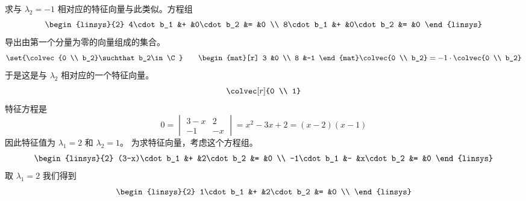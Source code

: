 \begin{exercises}
\begin{answer}
\begin{exparts}
           求与 $\lambda_2=-1$ 相对应的特征向量与此类似。方程组
           \begin{equation*}
             \begin{linsys}{2}
               4\cdot b_1  &+  &0\cdot b_2  &=  &0  \\
               8\cdot b_1  &+  &0\cdot b_2 &=  &0
             \end{linsys}
           \end{equation*}
           导出由第一个分量为零的向量组成的集合。
           \begin{equation*}
             \set{\colvec{0 \\ b_2}\suchthat b_2\in\C}
             \qquad
             \begin{mat}[r]
               3  &0  \\
               8  &-1
             \end{mat}
             \colvec{0  \\ b_2}
             =-1\cdot\colvec{0 \\ b_2}
           \end{equation*}
           于是这是与 $\lambda_2$ 相对应的一个特征向量。
           \begin{equation*}
             \colvec[r]{0 \\ 1}
           \end{equation*}
         \partsitem 特征方程是
           \begin{equation*}
             0=
             \begin{vmatrix}
               3-x  &2  \\
               -1   &-x               
             \end{vmatrix}
             =x^2-3x+2=(x-2)(x-1)
           \end{equation*}
           因此特征值为 $\lambda_1=2$ 和 $\lambda_2=1$。
           为求特征向量，考虑这个方程组。
           \begin{equation*}
             \begin{linsys}{2}
               (3-x)\cdot b_1  &+  &2\cdot b_2  &=  &0  \\
               -1\cdot b_1     &-  &x\cdot b_2  &=  &0
             \end{linsys}
           \end{equation*}
           取 $\lambda_1=2$ 我们得到
           \begin{equation*}
             \begin{linsys}{2}
                1\cdot b_1  &+  &2\cdot b_2  &=  &0  \\

\end{linsys}
\end{equation*}
\end{exparts}
\end{answer}
\end{exercises}

